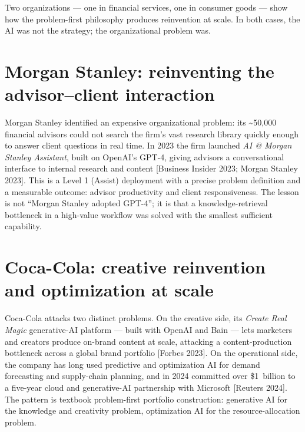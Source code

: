 
Two organizations — one in financial services, one in consumer goods — show
how the problem-first philosophy produces reinvention at scale. In both cases,
the AI was not the strategy; the organizational problem was.

\section{Morgan Stanley: reinventing the advisor--client interaction}

Morgan Stanley identified an expensive organizational problem: its
\~{}50,000 financial advisors could not search the firm's vast research
library quickly enough to answer client questions in real time. In 2023 the
firm launched \textit{AI @ Morgan Stanley Assistant}, built on OpenAI's
GPT-4, giving advisors a conversational interface to internal research and
content [Business Insider 2023; Morgan Stanley 2023]. This is a Level 1
(Assist) deployment with a precise problem definition and a measurable
outcome: advisor productivity and client responsiveness. The lesson is not
``Morgan Stanley adopted GPT-4''; it is that a knowledge-retrieval bottleneck
in a high-value workflow was solved with the smallest sufficient capability.

\section{Coca-Cola: creative reinvention and optimization at scale}

Coca-Cola attacks two distinct problems. On the creative side, its
\textit{Create Real Magic} generative-AI platform — built with OpenAI and
Bain — lets marketers and creators produce on-brand content at scale,
attacking a content-production bottleneck across a global brand portfolio
[Forbes 2023]. On the operational side, the company has long used predictive
and optimization AI for demand forecasting and supply-chain planning, and in
2024 committed over \$1~billion to a five-year cloud and generative-AI
partnership with Microsoft [Reuters 2024]. The pattern is textbook
problem-first portfolio construction: generative AI for the knowledge and
creativity problem, optimization AI for the resource-allocation problem.

